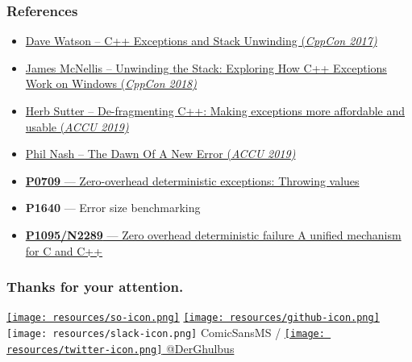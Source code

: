 \documentclass[aspectratio=169]{beamer}
\begin{document}
\begin{frame}
\frametitle{References}

\begin{itemize}
\item \href{https://www.youtube.com/watch?v=_Ivd3qzgT7U}{Dave Watson -- C++ Exceptions and Stack Unwinding (\em{CppCon 2017})}
\item \href{https://www.youtube.com/watch?v=COEv2kq_Ht8}{James McNellis -- Unwinding the Stack: Exploring How C++ Exceptions Work on Windows (\em{CppCon 2018})}
\item \href{https://www.youtube.com/watch?v=os7cqJ5qlzo}{Herb Sutter -- De-fragmenting C++: Making exceptions more affordable and usable (\em{ACCU 2019})}
\item \href{https://www.youtube.com/watch?v=2Jhfubg9yvA}{Phil Nash -- The Dawn Of A New Error (\em{ACCU 2019})}
\item \href{https://wg21.link/p0709}{\textbf{P0709} --- Zero-overhead deterministic exceptions: Throwing values}
\item \textbf{P1640} --- Error size benchmarking
\item \href{https://wg21.link/p1095}{\textbf{P1095/N2289} --- Zero overhead deterministic failure A unified mechanism for C and C++}

\end{itemize}

\end{frame}

\begin{frame}
  \frametitle{Thanks for your attention.}

  \href{https://stackoverflow.com/users/577603/comicsansms}{\texttt{[image: resources/so-icon.png]}}
  \href{https://github.com/ComicSansMS}{\texttt{[image: resources/github-icon.png]}}
  \texttt{[image: resources/slack-icon.png]} ComicSansMS /
  \href{https://twitter.com/DerGhulbus/}{\texttt{[image: resources/twitter-icon.png]} @DerGhulbus}

\end{frame}
\end{document}
